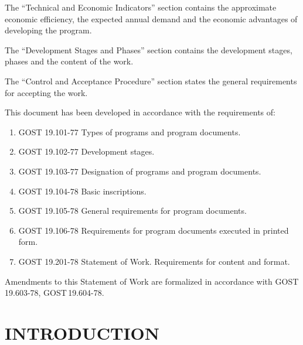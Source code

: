 \documentclass[12pt,a4paper]{extarticle}
\begin{document}
The \enquote{Technical and Economic Indicators} section contains the approximate economic efficiency, the expected annual demand and the economic advantages of developing the program.

The \enquote{Development Stages and Phases} section contains the development stages, phases and the content of the work.

The \enquote{Control and Acceptance Procedure} section states the general requirements for accepting the work.

\clearpage

\noindent
This document has been developed in accordance with the requirements of:

\begin{enumerate}[label=\arabic*), leftmargin=1.25cm]
\item GOST 19.101-77 Types of programs and program documents\cite{gost19101}.
\item GOST 19.102-77 Development stages\cite{gost19102}.
\item GOST 19.103-77 Designation of programs and program documents\cite{gost19103}.
\item GOST 19.104-78 Basic inscriptions\cite{gost19104}.
\item GOST 19.105-78 General requirements for program documents\cite{gost19105}.
\item GOST 19.106-78 Requirements for program documents executed in printed form\cite{gost19106}.
\item GOST 19.201-78 Statement of Work. Requirements for content and format\cite{gost19201}.
\end{enumerate}

Amendments to this Statement of Work are formalized in accordance with GOST\,19.603-78\cite{gost19603}, GOST\,19.604-78\cite{gost19604}.

\clearpage

\hypersetup{linkcolor=black}
\tableofcontents
\hypersetup{linkcolor=blue}
\thispagestyle{fancy}
\clearpage

\section{INTRODUCTION}
\end{document}

